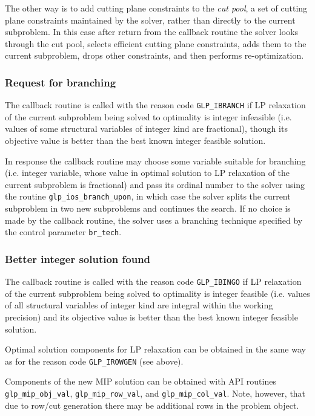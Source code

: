 The other way is to add cutting plane constraints to the {\it cut pool},
a set of cutting plane constraints maintained by the solver, rather than
directly to the current subproblem. In this case after return from the
callback routine the solver looks through the cut pool, selects
efficient cutting plane constraints, adds them to the current
subproblem, drops other constraints, and then performs re-optimization.

\subsubsection*{Request for branching}

The callback routine is called with the reason code \verb|GLP_IBRANCH|
if LP relaxation of the current subproblem being solved to optimality
is integer infeasible (i.e. values of some structural variables of
integer kind are fractional), though its objective value is better than
the best known integer feasible solution.

In response the callback routine may choose some variable suitable for
branching (i.e. integer variable, whose value in optimal solution to
LP relaxation of the current subproblem is fractional) and pass its
ordinal number to the solver using the routine
\verb|glp_ios_branch_upon|, in which case the solver splits the current
subproblem in two new subproblems and continues the search. If no choice
is made by the callback routine, the solver uses a branching technique
specified by the control parameter \verb|br_tech|.

\subsubsection*{Better integer solution found}

The callback routine is called with the reason code \verb|GLP_IBINGO|
if LP relaxation of the current subproblem being solved to optimality
is integer feasible (i.e. values of all structural variables of integer
kind are integral within the working precision) and its objective value
is better than the best known integer feasible solution.

Optimal solution components for LP relaxation can be obtained in the
same way as for the reason code \verb|GLP_IROWGEN| (see above).

Components of the new MIP solution can be obtained with API routines
\verb|glp_mip_obj_val|, \verb|glp_mip_row_val|, and
\verb|glp_mip_col_val|. Note, however, that due to row/cut generation
there may be additional rows in the problem object.

